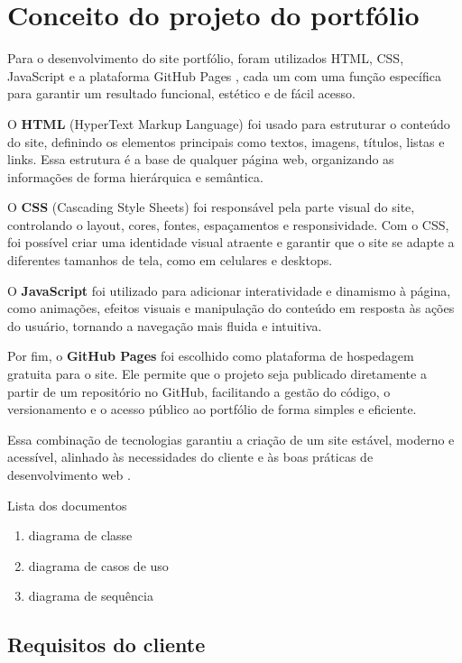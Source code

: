 \chapter{Conceito do projeto do portfólio}
\label{chap:fundteor}
Para o desenvolvimento do site portfólio, foram utilizados HTML, CSS, JavaScript e a plataforma GitHub Pages \cite{W3SchoolsTutorial,GitHubPages}, cada um com uma função específica para garantir um resultado funcional, estético e de fácil acesso.


O \textbf{HTML} (HyperText Markup Language) foi usado para estruturar o conteúdo do site, definindo os elementos principais como textos, imagens, títulos, listas e links. Essa estrutura é a base de qualquer página web, organizando as informações de forma hierárquica e semântica.

O \textbf{CSS} (Cascading Style Sheets) foi responsável pela parte visual do site, controlando o layout, cores, fontes, espaçamentos e responsividade. Com o CSS, foi possível criar uma identidade visual atraente e garantir que o site se adapte a diferentes tamanhos de tela, como em celulares e desktops.

O \textbf{JavaScript} foi utilizado para adicionar interatividade e dinamismo à página, como animações, efeitos visuais e manipulação do conteúdo em resposta às ações do usuário, tornando a navegação mais fluida e intuitiva.

Por fim, o \textbf{GitHub Pages} foi escolhido como plataforma de hospedagem gratuita para o site. Ele permite que o projeto seja publicado diretamente a partir de um repositório no GitHub, facilitando a gestão do código, o versionamento e o acesso público ao portfólio de forma simples e eficiente.

Essa combinação de tecnologias garantiu a criação de um site estável, moderno e acessível, alinhado às necessidades do cliente e às boas práticas de desenvolvimento web \cite{Pressman2016,Sommerville2011}.

Lista dos documentos
\begin{enumerate}
   \item diagrama de classe
   \item diagrama de casos de uso
   \item diagrama de sequência \cite{Larman2007}
\end{enumerate}

\section{Requisitos do cliente}
\label{sec:requisitos}

